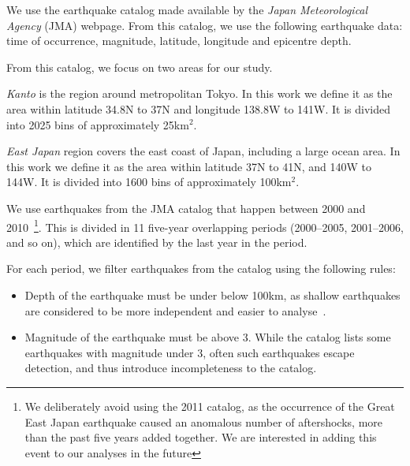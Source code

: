 
We use the earthquake catalog made available by the \emph{Japan
  Meteorological Agency} (JMA) webpage. From this catalog, we use the
following earthquake data: time of occurrence, magnitude, latitude,
longitude and epicentre depth.

From this catalog, we focus on two areas for our study.

\emph{Kanto} is the region around metropolitan Tokyo. In this work we
define it as the area within latitude 34.8N to 37N and longitude
138.8W to 141W. It is divided into 2025 bins of approximately
25km$^2$.

\emph{East Japan} region covers the east coast of Japan, including a
large ocean area. In this work we define it as the area within
latitude 37N to 41N, and 140W to 144W. It is divided into 1600 bins of
approximately 100km$^2$.




We use earthquakes from the JMA catalog that happen between 2000 and
2010~\footnote{We deliberately avoid using the 2011 catalog, as the
  occurrence of the Great East Japan earthquake caused an anomalous
  number of aftershocks, more than the past five years added
  together. We are interested in adding this event to our analyses in
  the future}. This is divided in 11 five-year overlapping periods
(2000--2005, 2001--2006, and so on), which are identified by the last
year in the period.

For each period, we filter earthquakes from the catalog using the
following rules: 
\begin{itemize}
\item Depth of the earthquake must be under below 100km, as shallow
  earthquakes are considered to be more independent and easier to
  analyse~\cite{yamanaka1990scaling}.
\item Magnitude of the earthquake must be above 3. While the catalog
  lists some earthquakes with magnitude under 3, often such
  earthquakes escape detection, and thus introduce incompleteness to
  the catalog.
\end{itemize}

